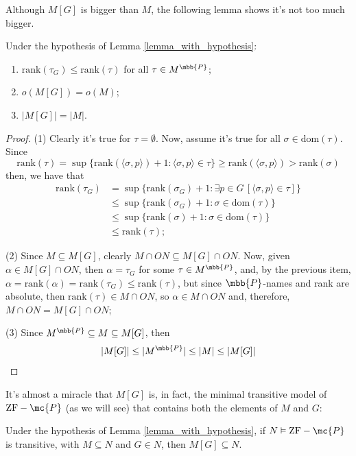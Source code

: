 Although $M[G]$ is bigger than $M$, the following lemma shows it's not too much bigger.

\begin{lemma}{}{}
    Under the hypothesis of Lemma \ref{lemma_with_hypothesis}:
    \begin{enumerate}
        \item $\text{rank}(\tau_G)\leq\text{rank}(\tau)$ for all $\tau\in M^{\mbb{P}}$;
        \item $o(M[G])=o(M)$;
        \item $\lvert M[G]\rvert=\lvert M\rvert$.
    \end{enumerate}
\end{lemma}

\begin{proof}
    (1) Clearly it's true for $\tau=\emptyset$. Now, assume it's true for all $\sigma\in\text{dom}(\tau)$. Since
    $$\text{rank}(\tau)=\sup\{\text{rank}(\langle\sigma,p\rangle)+1:\langle\sigma,p\rangle\in\tau\}\geq\text{rank}(\langle\sigma,p\rangle)>\text{rank}(\sigma)$$
    then, we have that
    \begin{align*}
        \text{rank}(\tau_G) & = \sup\{\text{rank}(\sigma_G)+1:\exists p\in G\,[\langle\sigma,p\rangle\in\tau]\}\\
        & \leq\sup\{\text{rank}(\sigma_G) + 1:\sigma\in\text{dom}(\tau)\}\\
        & \leq\sup\{\text{rank}(\sigma)+1:\sigma\in\text{dom}(\tau)\}\\
        & \leq\text{rank}(\tau);
    \end{align*}

    (2) Since $M\subseteq M[G]$, clearly $M\cap ON\subseteq M[G]\cap ON$. Now, given $\alpha\in M[G]\cap ON$, then $\alpha=\tau_G$ for some $\tau\in M^{\mbb{P}}$, and, by the previous item, $\alpha=\text{rank}(\alpha)=\text{rank}(\tau_G)\leq\text{rank}(\tau)$, but since $\mbb{P}$-names and rank are absolute, then $\text{rank}(\tau)\in M\cap ON$, so $\alpha\in M\cap ON$ and, therefore, $M\cap ON=M[G]\cap ON$;

    (3) Since $M^{\mbb{P}}\subseteq M\subseteq M[G]$, then
    $$\lvert M[G]\rvert\leq\lvert M^{\mbb{P}}\rvert\leq\lvert M\rvert\leq\lvert M[G]\rvert$$
\end{proof}

It's almost a miracle that $M[G]$ is, in fact, the minimal transitive model of $\text{ZF}-\mc{P}$ (as we will see) that contains both the elements of $M$ and $G$:

\begin{lemma}{}{}
    Under the hypothesis of Lemma \ref{lemma_with_hypothesis}, if $N\vDash\text{ZF}-\mc{P}$ is transitive, with $M\subseteq N$ and $G\in N$, then $M[G]\subseteq N$.
\end{lemma}

